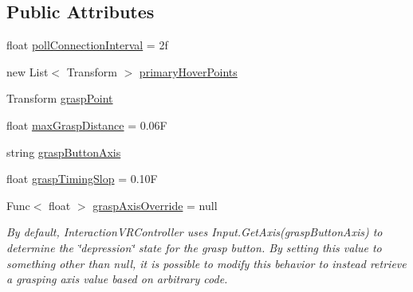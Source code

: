 \subsection*{Public Attributes}
\begin{DoxyCompactItemize}
\item 
float \mbox{\hyperlink{class_leap_1_1_unity_1_1_interaction_1_1_interaction_x_r_controller_a870363d8aa13c1d14481b988608b195e}{poll\+Connection\+Interval}} = 2f
\item 
new List$<$ Transform $>$ \mbox{\hyperlink{class_leap_1_1_unity_1_1_interaction_1_1_interaction_x_r_controller_a1b5abc7602f840695df4eae23ead0e37}{primary\+Hover\+Points}}
\item 
Transform \mbox{\hyperlink{class_leap_1_1_unity_1_1_interaction_1_1_interaction_x_r_controller_a45e35489ae52235acd3cece14cf4dbae}{grasp\+Point}}
\item 
float \mbox{\hyperlink{class_leap_1_1_unity_1_1_interaction_1_1_interaction_x_r_controller_abd2f8566d2d0e95acd51ae7718b8bc98}{max\+Grasp\+Distance}} = 0.\+06F
\item 
string \mbox{\hyperlink{class_leap_1_1_unity_1_1_interaction_1_1_interaction_x_r_controller_a857761fb2f53cdf7e9ffd28f396c4712}{grasp\+Button\+Axis}}
\item 
float \mbox{\hyperlink{class_leap_1_1_unity_1_1_interaction_1_1_interaction_x_r_controller_a6fe4112d61321e09eabefbc59af9d13a}{grasp\+Timing\+Slop}} = 0.\+10F
\item 
Func$<$ float $>$ \mbox{\hyperlink{class_leap_1_1_unity_1_1_interaction_1_1_interaction_x_r_controller_a5c3b54bb8249aacff51aa5e898d95021}{grasp\+Axis\+Override}} = null
\begin{DoxyCompactList}\small\item\em By default, Interaction\+V\+R\+Controller uses Input.\+Get\+Axis(grasp\+Button\+Axis) to determine the \char`\"{}depression\char`\"{} state for the grasp button. By setting this value to something other than null, it is possible to modify this behavior to instead retrieve a grasping axis value based on arbitrary code. \end{DoxyCompactList}\end{DoxyCompactItemize}
